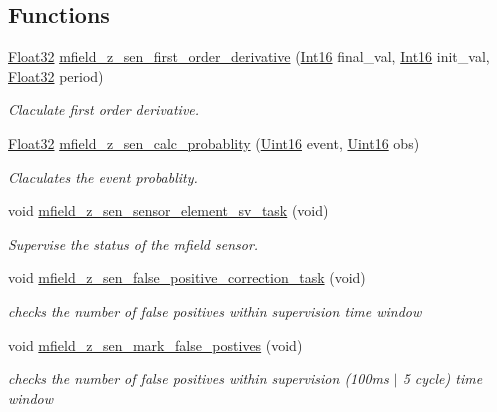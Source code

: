 \subsection*{Functions}
\begin{DoxyCompactItemize}
\item 
\hyperlink{a00072_a87d38f886e617ced2698fc55afa07637}{Float32} \hyperlink{a00027_a82939d05c14b8ab80cacc21b7a1b8d3e}{mfield\+\_\+z\+\_\+sen\+\_\+first\+\_\+order\+\_\+derivative} (\hyperlink{a00072_a659ce9e5eb6571f9984ffc7caad2660a}{Int16} final\+\_\+val, \hyperlink{a00072_a659ce9e5eb6571f9984ffc7caad2660a}{Int16} init\+\_\+val, \hyperlink{a00072_a87d38f886e617ced2698fc55afa07637}{Float32} period)
\begin{DoxyCompactList}\small\item\em Claculate first order derivative. \end{DoxyCompactList}\item 
\hyperlink{a00072_a87d38f886e617ced2698fc55afa07637}{Float32} \hyperlink{a00027_a8a5c3986dbe778d199b6e3b485f7a34b}{mfield\+\_\+z\+\_\+sen\+\_\+calc\+\_\+probablity} (\hyperlink{a00072_a59a9f6be4562c327cbfb4f7e8e18f08b}{Uint16} event, \hyperlink{a00072_a59a9f6be4562c327cbfb4f7e8e18f08b}{Uint16} obs)
\begin{DoxyCompactList}\small\item\em Claculates the event probablity. \end{DoxyCompactList}\item 
void \hyperlink{a00027_ab3b441646e86a6cf6ddfe83c1af4e075}{mfield\+\_\+z\+\_\+sen\+\_\+sensor\+\_\+element\+\_\+sv\+\_\+task} (void)
\begin{DoxyCompactList}\small\item\em Supervise the status of the mfield sensor. \end{DoxyCompactList}\item 
void \hyperlink{a00027_a36a65e3e838c4f7be43267a10532d318}{mfield\+\_\+z\+\_\+sen\+\_\+false\+\_\+positive\+\_\+correction\+\_\+task} (void)
\begin{DoxyCompactList}\small\item\em checks the number of false positives within supervision time window \end{DoxyCompactList}\item 
void \hyperlink{a00027_acd2adf617d062b1d3dfc9df79aa2ad32}{mfield\+\_\+z\+\_\+sen\+\_\+mark\+\_\+false\+\_\+postives} (void)
\begin{DoxyCompactList}\small\item\em checks the number of false positives within supervision (100ms $\vert$ 5 cycle) time window \end{DoxyCompactList}\item 

\end{DoxyCompactItemize}
